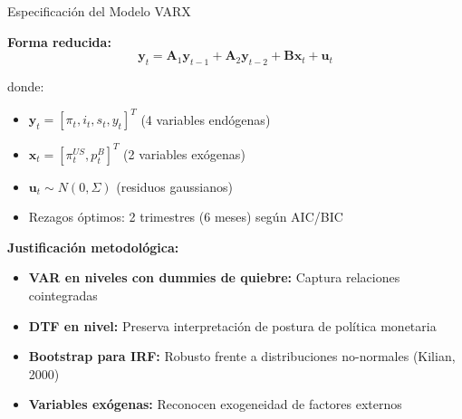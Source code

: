 \documentclass{beamer}
\begin{document}
\begin{frame}{Especificación del Modelo VARX}

\small
\textbf{Forma reducida:}
\begin{equation*}
\mathbf{y}_t = \mathbf{A}_1\mathbf{y}_{t-1} + \mathbf{A}_2\mathbf{y}_{t-2} + \mathbf{B}\mathbf{x}_t + \mathbf{u}_t
\end{equation*}

donde:
\begin{itemize}
\item $\mathbf{y}_t = [\pi_t, i_t, s_t, y_t]^T$ (4 variables endógenas)
\item $\mathbf{x}_t = [\pi^{US}_t, p^{B}_t]^T$ (2 variables exógenas)
\item $\mathbf{u}_t \sim N(0, \Sigma)$ (residuos gaussianos)
\item Rezagos óptimos: 2 trimestres (6 meses) según AIC/BIC
\end{itemize}

\vspace{0.3cm}
\textbf{Justificación metodológica:}
\begin{itemize}
\item \textbf{VAR en niveles con dummies de quiebre:} Captura relaciones cointegradas
\item \textbf{DTF en nivel:} Preserva interpretación de postura de política monetaria
\item \textbf{Bootstrap para IRF:} Robusto frente a distribuciones no-normales (Kilian, 2000)
\item \textbf{Variables exógenas:} Reconocen exogeneidad de factores externos
\end{itemize}
\end{frame}
\end{document}
